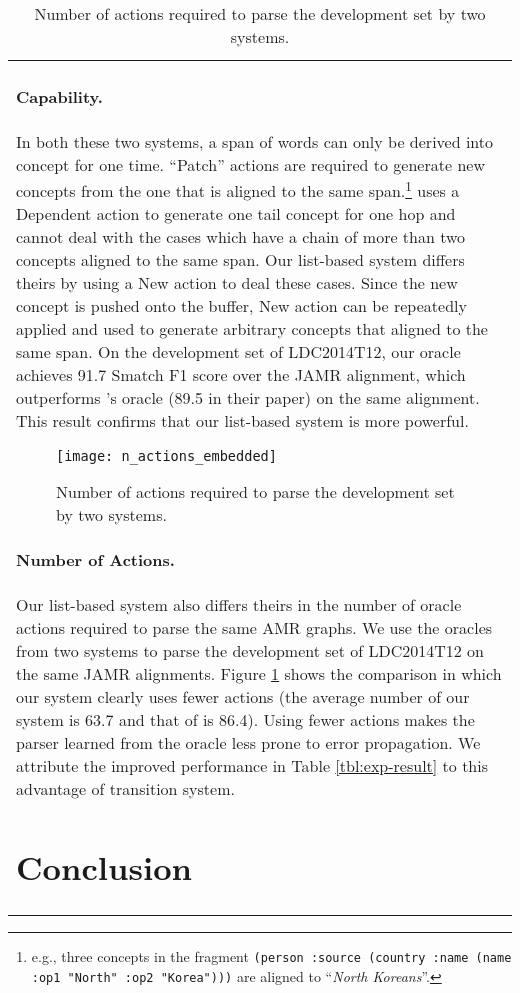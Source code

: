 \documentclass[11pt,a4paper]{article}
\begin{document}
\begin{table}[t]
\begin{tabular}{p{}}
\paragraph{Capability.} In both these two systems, a span of words can only be derived into concept for one time.
``Patch'' actions are required to generate new concepts from the one that 
is aligned to the same span.\footnote{
	e.g., three concepts in
	the fragment {\tt (person :source (country :name (name :op1 "North" :op2 "Korea")))}
	are aligned to ``{\it North Koreans}''.}
\citet{ballesteros-alonaizan:2017:EMNLP2017} uses a {\sc Dependent} action
to generate one tail concept for one hop and cannot deal with the cases
which have a chain of more than two concepts aligned to the same span.
Our list-based system differs theirs by using a {\sc New} action to deal these cases.
Since the new concept is pushed onto the buffer, {\sc New} action can be repeatedly
applied and used to generate arbitrary concepts that aligned to the same span. 
On the development set of LDC2014T12, our oracle achieves 91.7 Smatch F1 score
over the JAMR alignment, which outperforms \citet{ballesteros-alonaizan:2017:EMNLP2017}'s oracle 
(89.5 in their paper) on the same alignment.
This result confirms that our list-based system is more
powerful.

\begin{figure}
	\texttt{[image: n\_actions\_embedded]}
	\caption{Number of actions required to 
		parse the development set by two systems.}\label{fig:tok_act}
\end{figure}

\paragraph{Number of Actions.} Our list-based system also differs theirs in the number of
oracle actions required to parse the same AMR graphs.
We use the oracles from two systems to parse the development set of LDC2014T12
on the same JAMR alignments.
Figure \ref{fig:tok_act} shows the comparison in which our system
clearly uses fewer actions (the average number of our system is 63.7 and that of
\citet{ballesteros-alonaizan:2017:EMNLP2017} is 86.4).
Using fewer actions makes the parser learned from the oracle less
prone to error propagation. 
We attribute the improved performance in Table \ref{tbl:exp-result}
to this advantage of transition system.


\section{Conclusion}


\end{tabular}
\end{table}
\end{document}
